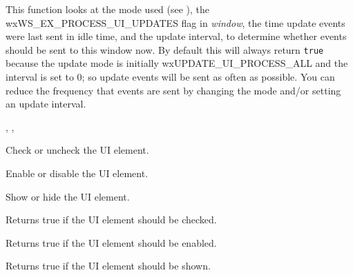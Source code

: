 This function looks at the mode used (see ),
the wxWS\_EX\_PROCESS\_UI\_UPDATES flag in {\it window},
the time update events were last sent in idle time, and
the update interval, to determine whether events should be sent to
this window now. By default this will always return {\tt true} because
the update mode is initially wxUPDATE\_UI\_PROCESS\_ALL and
the interval is set to 0; so update events will be sent as
often as possible. You can reduce the frequency that events
are sent by changing the mode and/or setting an update interval.


, 
, 

\label{wxupdateuieventcheck}


Check or uncheck the UI element.

\label{wxupdateuieventenable}


Enable or disable the UI element.

\label{wxupdateuieventshow}


Show or hide the UI element.

\label{wxupdateuieventgetchecked}


Returns true if the UI element should be checked.

\label{wxupdateuieventgetenabled}


Returns true if the UI element should be enabled.

\label{wxupdateuieventgetshown}


Returns true if the UI element should be shown.

\label{wxupdateuieventgetsetchecked}

